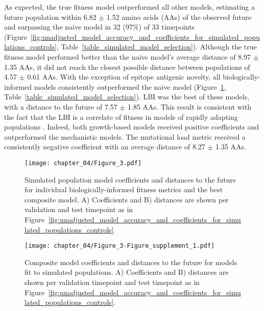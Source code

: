 As expected, the true fitness model outperformed all other models, estimating a future population within 6.82 $\pm$ 1.52 amino acids (AAs) of the observed future and surpassing the naive model in 32 (97\%) of 33 timepoints (Figure~\ref{fig:unadjusted_model_accuracy_and_coefficients_for_simulated_populations_controls}, Table~\ref{table_simulated_model_selection}).
Although the true fitness model performed better than the naive model's average distance of 8.97 $\pm$ 1.35 AAs, it did not reach the closest possible distance between populations of 4.57 $\pm$ 0.61 AAs.
With the exception of epitope antigenic novelty, all biologically-informed models consistently outperformed the naive model (Figure~\ref{fig:unadjusted_model_accuracy_and_coefficients_for_simulated_populations}, Table~\ref{table_simulated_model_selection}).
LBI was the best of these models, with a distance to the future of 7.57 $\pm$ 1.85 AAs.
This result is consistent with the fact that the LBI is a correlate of fitness in models of rapidly adapting populations \citep{Neher:2014eu}.
Indeed, both growth-based models received positive coefficients and outperformed the mechanistic models.
The mutational load metric received a consistently negative coefficient with an average distance of 8.27 $\pm$ 1.35 AAs.

\begin{figure}
  \texttt{[image: chapter\_04/Figure\_3.pdf]}
  \caption{
    Simulated population model coefficients and distances to the future for individual biologically-informed fitness metrics and the best composite model.
    A) Coefficients and B) distances are shown per validation and test timepoint as in Figure~\ref{fig:unadjusted_model_accuracy_and_coefficients_for_simulated_populations_controls}.
  }
  \label{fig:unadjusted_model_accuracy_and_coefficients_for_simulated_populations}
\end{figure}

\begin{figure}
    \texttt{[image: chapter\_04/Figure\_3-Figure\_supplement\_1.pdf]}
    \caption{
      Composite model coefficients and distances to the future for models fit to simulated populations.
      A) Coefficients and B) distances are shown per validation timepoint and test timepoint as in Figure~\ref{fig:unadjusted_model_accuracy_and_coefficients_for_simulated_populations_controls}.
    }
    \label{fig:unadjusted_composite_model_accuracy_and_coefficients_for_simulated_populations}
\end{figure}

